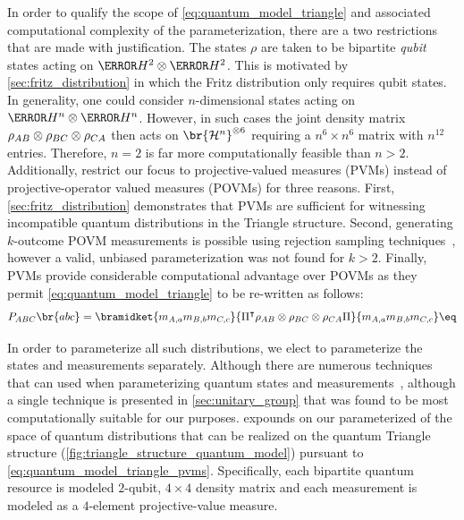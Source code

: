 \documentclass[aps, 10pt, english, twoside, pra, nofootinbib, tightenlines, longbibliography, superscriptaddress]{revtex4-1}
\begin{document}
    In order to qualify the scope of \cref{eq:quantum_model_triangle} and associated computational complexity of the parameterization, there are a two restrictions that are made with justification. The states $\rho$ are taken to be bipartite \textit{qubit} states acting on $\s{H}^{2} \otimes \s{H}^{2}$. This is motivated by \cref{sec:fritz_distribution} in which the Fritz distribution only requires qubit states. In generality, one could consider $n$-dimensional states acting on $\s{H}^{n} \otimes \s{H}^{n}$. However, in such cases the joint density matrix $\rho_{AB}\otimes\rho_{BC}\otimes\rho_{CA}$ then acts on $\br{\Hilb^{n}}^{\otimes 6}$ requiring a $n^6 \times n^6$ matrix with $n^{12}$ entries. Therefore, $n = 2$ is far more computationally feasible than $n > 2$. Additionally, restrict our focus to projective-valued measures (PVMs) instead of projective-operator valued measures (POVMs) for three reasons. First, \cref{sec:fritz_distribution} demonstrates that PVMs are sufficient for witnessing incompatible quantum distributions in the Triangle structure. Second, generating $k$-outcome POVM measurements is possible using rejection sampling techniques~\cite{Petz_2015}, however a valid, unbiased parameterization was not found for $k > 2$. Finally, PVMs provide considerable computational advantage over POVMs as they permit \cref{eq:quantum_model_triangle} to be re-written as follows:
    \[ \prob[\p{ABC}]\br{abc} = \bramidket{m_{\p{A},a}m_{\p{B},b}m_{\p{C},c}}{\netperm^\intercal \rho_{AB}\otimes\rho_{BC}\otimes\rho_{CA} \netperm}{m_{\p{A},a}m_{\p{B},b}m_{\p{C},c}} \eq \label{eq:quantum_model_triangle_pvms}\]

    In order to parameterize all such distributions, we elect to parameterize the states and measurements separately. Although there are numerous techniques that can used when parameterizing quantum states and measurements~\cite{Petz_2015, Hedemann_2013,Fujii_2005,James_2001,Grasmair_2014,Neilsen_Chaung_2011}, although a single technique is presented in \cref{sec:unitary_group} that was found to be most computationally suitable for our purposes.  expounds on our parameterized of the space of quantum distributions that can be realized on the quantum Triangle structure (\cref{fig:triangle_structure_quantum_model}) pursuant to \cref{eq:quantum_model_triangle_pvms}. Specifically, each bipartite quantum resource is modeled $2$-qubit, $4\times 4$ density matrix and each measurement is modeled as a $4$-element projective-value measure.

    \label{sec:results}
\end{document}
